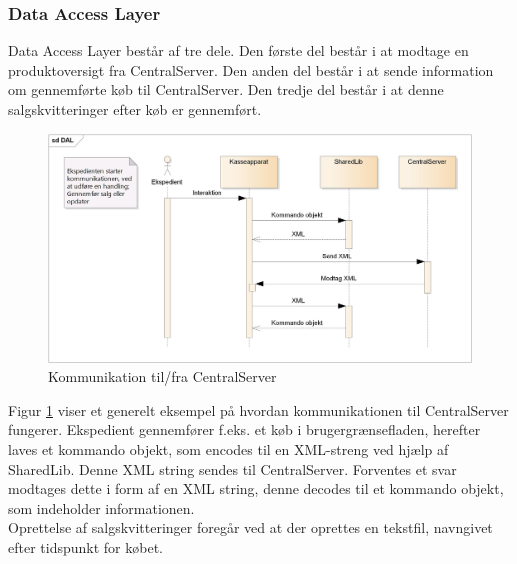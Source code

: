 \subsubsection{Data Access Layer}
Data Access Layer består af tre dele. Den første del består i at modtage en produktoversigt fra CentralServer. Den anden del består i at sende information om gennemførte køb til CentralServer. Den tredje del består i at denne salgskvitteringer efter køb er gennemført.

\begin{figure}[H]
	\centering
	\includegraphics[width=\textwidth]{Projektbeskrivelse/DesignOgImplementering/Frontend/Pics/DALsq}
	\caption{Kommunikation til/fra CentralServer}
	\label{fig:KAtCS}
\end{figure}

Figur \ref{fig:KAtCS} viser et generelt eksempel på hvordan kommunikationen til CentralServer fungerer. Ekspedient gennemfører f.eks. et køb i brugergrænsefladen, herefter laves et kommando objekt, som encodes til en XML-streng ved hjælp af SharedLib. Denne XML string sendes til CentralServer. Forventes et svar modtages dette i form af en XML string, denne decodes til et kommando objekt, som indeholder informationen.\\
Oprettelse af salgskvitteringer foregår ved at der oprettes en tekstfil, navngivet efter tidspunkt for købet.
